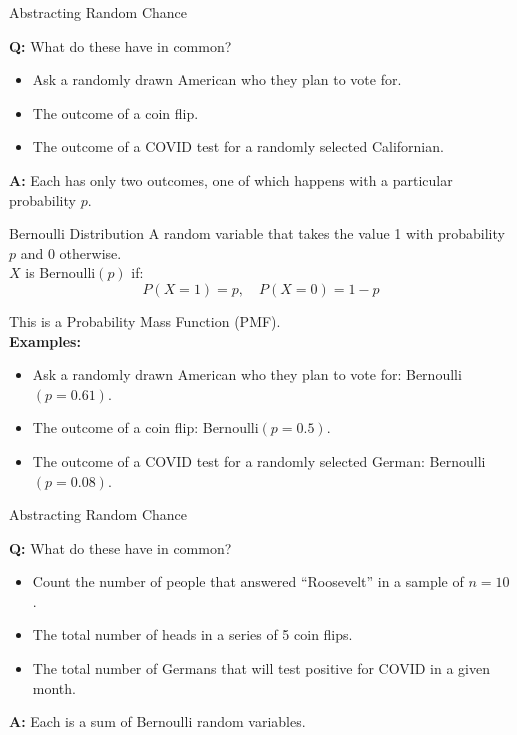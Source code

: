 \documentclass[aspectratio=169]{../latex_main/tntbeamer}  %
\begin{document}
\begin{frame}{Abstracting Random Chance}

    \textbf{Q:} What do these have in common? \\
    
    \begin{itemize}
        \item Ask a randomly drawn American who they plan to vote for.
        \item The outcome of a coin flip.
        \item The outcome of a COVID test for a randomly selected Californian.
    \end{itemize}
    \pause
    \bigskip

    \textbf{A:} Each has only two outcomes, one of which happens with a particular probability $p$.
\end{frame}

\begin{frame}{Bernoulli Distribution}
    A random variable that takes the value 1 with probability $p$ and 0 otherwise.\\
    
    $X$ is Bernoulli$(p)$ if:
    \begin{equation}
    P(X = 1) = p, \quad P(X = 0) = 1 - p
    \end{equation}

    This is a Probability Mass Function (PMF).\\

    \textbf{Examples:}
    \begin{itemize}
        \item Ask a randomly drawn American who they plan to vote for: Bernoulli$(p = 0.61)$.
        \item The outcome of a coin flip: Bernoulli$(p = 0.5)$.
        \item The outcome of a COVID test for a randomly selected German: Bernoulli$(p = 0.08)$.
    \end{itemize}
\end{frame}

\begin{frame}{Abstracting Random Chance}

    \textbf{Q:} What do these have in common? \\

    \begin{itemize}
        \item Count the number of people that answered “Roosevelt” in a sample of $n = 10$.
        \item The total number of heads in a series of 5 coin flips.
        \item The total number of Germans that will test positive for COVID in a given month.
    \end{itemize}
    \pause
    \bigskip

    \textbf{A:} Each is a sum of Bernoulli random variables.
\end{frame}
\end{document}
